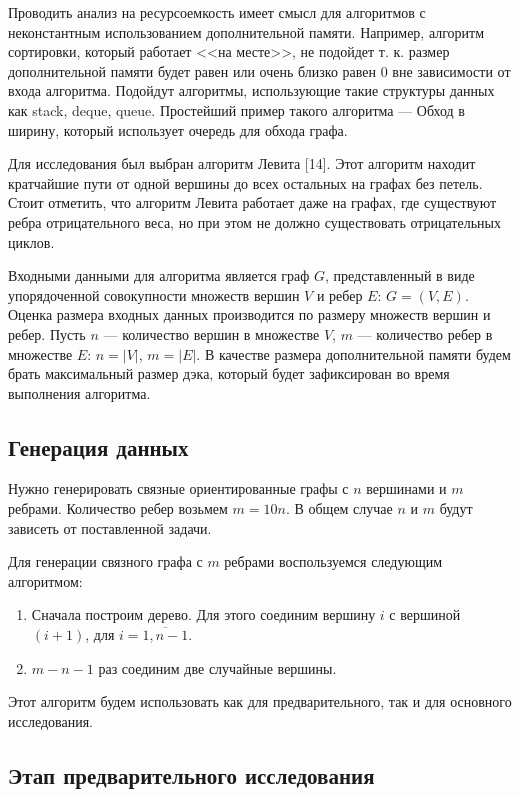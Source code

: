 Проводить анализ на ресурсоемкость имеет смысл для алгоритмов с неконстантным использованием дополнительной памяти. Например, алгоритм сортировки, который работает <<на месте>>, не подойдет т. к. размер дополнительной памяти будет равен или очень близко равен 0 вне зависимости от входа алгоритма. Подойдут алгоритмы, использующие такие структуры данных как stack, deque, queue. Простейший пример такого алгоритма --- Обход в ширину, который использует очередь для обхода графа.

Для исследования был выбран алгоритм Левита [14]. Этот алгоритм находит кратчайшие пути от одной вершины до всех остальных на графах без петель. Стоит отметить, что алгоритм Левита работает даже на графах, где существуют ребра отрицательного веса, но при этом не должно существовать отрицательных циклов.

Входными данными для алгоритма является граф $G$, представленный в виде упорядоченной совокупности множеств вершин $V$ и ребер $E$:
$G = (V, E)$. Оценка размера входных данных производится по размеру
множеств вершин и ребер. Пусть $n$ — количество вершин в множестве $V$, $m$ — количество ребер в множестве $E$: $n = |V|$, $m = |E|$. В качестве размера дополнительной памяти будем брать максимальный размер дэка, который будет зафиксирован во время выполнения алгоритма.

\subsection{Генерация данных}

Нужно генерировать связные ориентированные графы с $n$ вершинами и $m$ ребрами. Количество ребер возьмем $m = 10n$. В общем случае $n$  и $m$ будут зависеть от поставленной задачи.

Для генерации связного графа с $m$ ребрами воспользуемся следующим алгоритмом:
\begin{enumerate}
\item Сначала построим дерево. Для этого соединим вершину $i$ с вершиной $(i + 1)$, для $i = \overline{1, n-1}$.
\item $m - n - 1$ раз соединим две случайные вершины.
\end{enumerate}

Этот алгоритм будем использовать как для предварительного, так и для основного исследования.

\subsection{Этап предварительного исследования}

